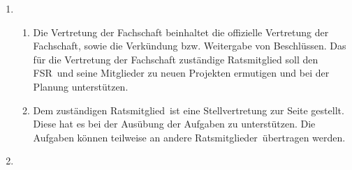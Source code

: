 \documentclass[a4paper, 12pt, ngerman]{article}
\newcommand{\rat}{FSR}
\newcommand{\mitglieder}{Ratsmitglieder}
\newcommand{\mitglied}{Ratsmitglied}
\begin{document}
\begin{enumerate}[leftmargin=0cm]
	\item {}
	
	\begin{enumerate}[leftmargin=0cm]
		\item Die Vertretung der Fachschaft beinhaltet die offizielle Vertretung der Fachschaft, sowie die Verkündung bzw. Weitergabe von Beschlüssen. Das für die Vertretung der Fachschaft zuständige Ratsmitglied soll den \rat~und seine Mitglieder zu neuen Projekten ermutigen und bei der Planung unterstützen.
		\item Dem zuständigen \mitglied~ist eine Stellvertretung zur Seite gestellt. Diese hat es bei der Ausübung der Aufgaben zu unterstützen. Die Aufgaben können teilweise an andere \mitglieder~übertragen werden. 
	\end{enumerate}
	
	\item {}
	

\end{enumerate}
\end{document}
